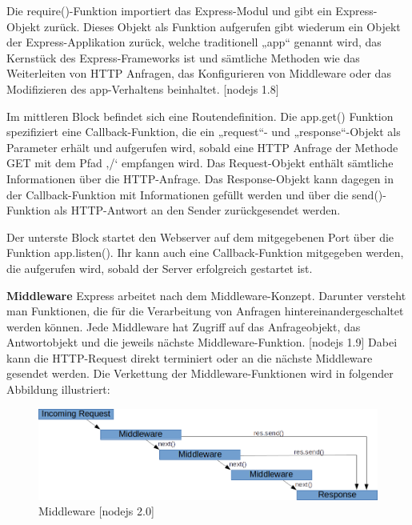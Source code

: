Die require()-Funktion importiert das Express-Modul und gibt ein Express-Objekt zurück. Dieses Objekt als Funktion aufgerufen gibt wiederum ein Objekt der Express-Applikation zurück, welche traditionell „app“ genannt wird, das Kernstück des Express-Frameworks ist und sämtliche Methoden wie das Weiterleiten von HTTP Anfragen, das Konfigurieren von Middleware oder das Modifizieren des app-Verhaltens beinhaltet. [nodejs 1.8]\newline 

Im mittleren Block befindet sich eine Routendefinition. Die app.get() Funktion spezifiziert eine Callback-Funktion, die ein „request“- und „response“-Objekt als Parameter erhält und aufgerufen wird, sobald eine HTTP Anfrage der Methode GET mit dem Pfad ‚/‘ empfangen wird. Das Request-Objekt enthält sämtliche Informationen über die HTTP-Anfrage. Das Response-Objekt kann dagegen in der Callback-Funktion mit Informationen gefüllt werden und über die send()-Funktion als HTTP-Antwort an den Sender zurückgesendet werden.\newline

Der unterste Block startet den Webserver auf dem mitgegebenen Port über die Funktion app.listen(). Ihr kann auch eine Callback-Funktion mitgegeben werden, die aufgerufen wird, sobald der Server erfolgreich gestartet ist.\newpage

\textbf{Middleware}
\newline
Express arbeitet nach dem Middleware-Konzept. Darunter versteht man Funktionen, die für die Verarbeitung von Anfragen hintereinandergeschaltet werden können. Jede Middleware hat Zugriff auf das Anfrageobjekt, das Antwortobjekt und die jeweils nächste Middleware-Funktion. [nodejs 1.9]
Dabei kann die HTTP-Request direkt terminiert oder an die nächste Middleware gesendet werden. Die Verkettung der Middleware-Funktionen wird in folgender Abbildung illustriert: \newline

\begin{figure}[h]
\centering
\includegraphics[width=12cm]{images/nodejs_middleware.png}
\caption{Middleware [nodejs 2.0]}
\end{figure}

